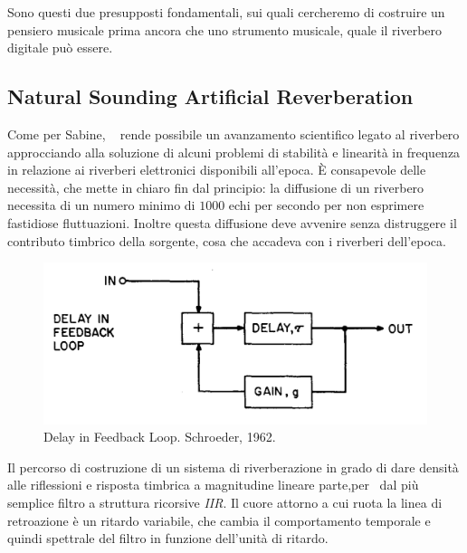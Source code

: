 \begin{refsection}
Sono questi due presupposti fondamentali, sui quali cercheremo di costruire un
pensiero musicale prima ancora che uno strumento musicale, quale il riverbero
digitale può essere.

\subsection{Natural Sounding Artificial Reverberation}


Come per Sabine, \ms~ rende possibile un avanzamento scientifico legato
al riverbero approcciando alla soluzione di alcuni problemi di stabilità e
linearità in frequenza in relazione ai riverberi elettronici disponibili all'epoca.
È consapevole delle necessità, che mette in chiaro fin dal principio: la diffusione
di un riverbero necessita di un numero minimo di $1000$ echi per secondo per non
esprimere fastidiose fluttuazioni. Inoltre questa diffusione deve avvenire senza
distruggere il contributo timbrico della sorgente, cosa che accadeva con i
riverberi dell'epoca.

\begin{figure}[hb]
  \centering
  \includegraphics[width=\textwidth]{CAPITOLI/0500/IMG/dfl.png}
  \caption[]{Delay in Feedback Loop. Schroeder, 1962.}
  \label{schroeder:dfl}
\end{figure}

Il percorso di costruzione di un sistema di riverberazione in grado di dare
densità alle riflessioni e risposta timbrica a magnitudine lineare parte,per
\ms~dal più semplice filtro a struttura ricorsive \emph{IIR}. Il
cuore attorno a cui ruota la linea di retroazione è un ritardo variabile, che
cambia il comportamento temporale e quindi spettrale del filtro in funzione
dell'unità di ritardo.


\end{refsection}
